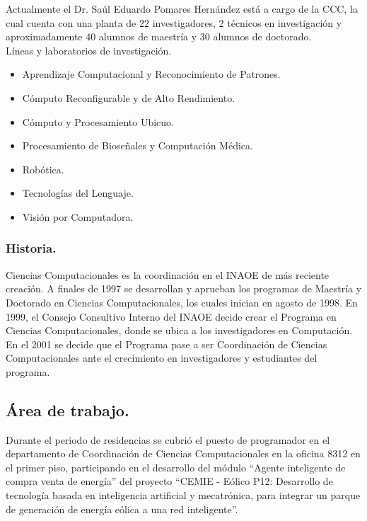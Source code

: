 Actualmente el Dr. Saúl Eduardo Pomares Hernández está a cargo de la CCC, la cual cuenta con una planta de 22 investigadores, 2 técnicos en investigación y aproximadamente  40 alumnos de maestría y 30 alumnos de doctorado.
\\
 
Líneas y laboratorios de investigación.
\begin{itemize}
   \item Aprendizaje Computacional y Reconocimiento de Patrones.
   \item Cómputo Reconfigurable y de Alto Rendimiento.
   \item Cómputo y Procesamiento Ubicuo.
   \item Procesamiento de Bioseñales y Computación Médica.
   \item Robótica.
   \item Tecnologías del Lenguaje.
   \item Visión por Computadora.
\end{itemize}

\subsubsection{Historia.}

Ciencias Computacionales es la coordinación en el INAOE de más reciente creación. A finales de 1997 se desarrollan y aprueban los programas de Maestría y Doctorado en Ciencias Computacionales, los cuales inician en agosto de 1998. En 1999, el Consejo Consultivo Interno del INAOE decide crear el Programa en Ciencias Computacionales, donde se ubica a los investigadores en Computación. En el 2001 se decide que el Programa pase a ser Coordinación de Ciencias Computacionales ante el crecimiento en investigadores y estudiantes del programa.

\subsection{Área de trabajo.}

Durante el periodo de residencias se cubrió el puesto de programador en el departamento de Coordinación de Ciencias Computacionales en la oficina 8312 en el primer piso, participando en el desarrollo del módulo ``Agente inteligente de compra venta de energía'' del proyecto ``CEMIE - Eólico P12: Desarrollo de tecnología basada en inteligencia artificial y mecatrónica, para integrar un parque de generación de energía eólica a una red inteligente''.
\\

